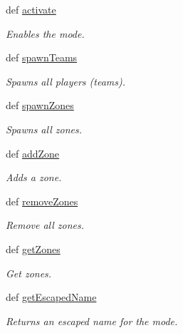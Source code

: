 \begin{DoxyCompactItemize}
def \hyperlink{class_mode_1_1_mode_a6cf2ccffddfb377d9abdb116ba74bd3b}{activate}
\begin{DoxyCompactList}\small\item\em Enables the mode. \item\end{DoxyCompactList}\item 
def \hyperlink{class_mode_1_1_mode_a356d4927de4587c311227527e55eaada}{spawnTeams}
\begin{DoxyCompactList}\small\item\em Spawns all players (teams). \item\end{DoxyCompactList}\item 
def \hyperlink{class_mode_1_1_mode_a152e7d0cf7d765c82810d69662f8af40}{spawnZones}
\begin{DoxyCompactList}\small\item\em Spawns all zones. \item\end{DoxyCompactList}\item 
def \hyperlink{class_mode_1_1_mode_ae24a354b3b872ac4d0c12c43cec5f475}{addZone}
\begin{DoxyCompactList}\small\item\em Adds a zone. \item\end{DoxyCompactList}\item 
def \hyperlink{class_mode_1_1_mode_ac957f54f8b2dae24ec1d72af3d53f0ef}{removeZones}
\begin{DoxyCompactList}\small\item\em Remove all zones. \item\end{DoxyCompactList}\item 
def \hyperlink{class_mode_1_1_mode_a2bf7c935b63449284449c845ad6b5321}{getZones}
\begin{DoxyCompactList}\small\item\em Get zones. \item\end{DoxyCompactList}\item 
def \hyperlink{class_mode_1_1_mode_ac1d907aa0ec93e0908aa3fa2cac0bde7}{getEscapedName}
\begin{DoxyCompactList}\small\item\em Returns an escaped name for the mode. \item\end{DoxyCompactList}\end{DoxyCompactItemize}
